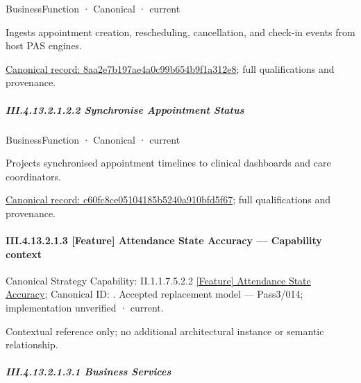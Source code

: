 \label{element:8aa2e7b197ae4a0c99b654b9f1a312e8}
{\small BusinessFunction · Canonical · current}\par

Ingests appointment creation, rescheduling, cancellation, and check-in events from host PAS engines.


{\footnotesize \href{../../../../../../../../continuum/business/business-function/8aa2e7b197ae4a0c99b654b9f1a312e8.md}{Canonical record: 8aa2e7b197ae4a0c99b654b9f1a312e8}; full qualifications and provenance.}\par
\subparagraph*{III.4.13.2.1.2.2 Synchronise Appointment Status}
\label{navigation:III.4.13.2.1.2.2}

\label{element:c60fc8ce05104185b5240a910bfd5f67}
{\small BusinessFunction · Canonical · current}\par

Projects synchronised appointment timelines to clinical dashboards and care coordinators.


{\footnotesize \href{../../../../../../../../continuum/business/business-function/c60fc8ce05104185b5240a910bfd5f67.md}{Canonical record: c60fc8ce05104185b5240a910bfd5f67}; full qualifications and provenance.}\par
\paragraph*{III.4.13.2.1.3 [Feature] Attendance State Accuracy — Capability context}
\label{navigation:III.4.13.2.1.3}

{\small Canonical Strategy Capability: II.1.1.7.5.2.2 \hyperref[element:9fd06e573a6144b9a43ecebc8ead3baf]{[Feature] Attendance State Accuracy}; Canonical ID: \texttt{}. Accepted replacement model — Pass3/014; implementation unverified · current.}\par
Contextual reference only; no additional architectural instance or semantic relationship.\par
\subparagraph*{III.4.13.2.1.3.1 Business Services}
\label{navigation:III.4.13.2.1.3.1}

